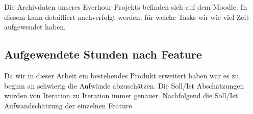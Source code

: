 Die Archivdaten unseres Everhour Projekts befinden sich auf dem Moodle. 
In diesem kann detailliert nachverfolgt werden, 
für welche Tasks wir wie viel Zeit aufgewendet haben.


\subsection{Aufgewendete Stunden nach Feature}
Da wir in dieser Arbeit ein bestehendes Produkt erweitert haben war es zu beginn an
schwierig die Aufwände abzuschätzen. Die Soll/Ist Abschätzungen wurden von Iteration zu Iteration
immer genauer. Nachfolgend die Soll/Ist Aufwandschätzung der einzelnen Feature.


